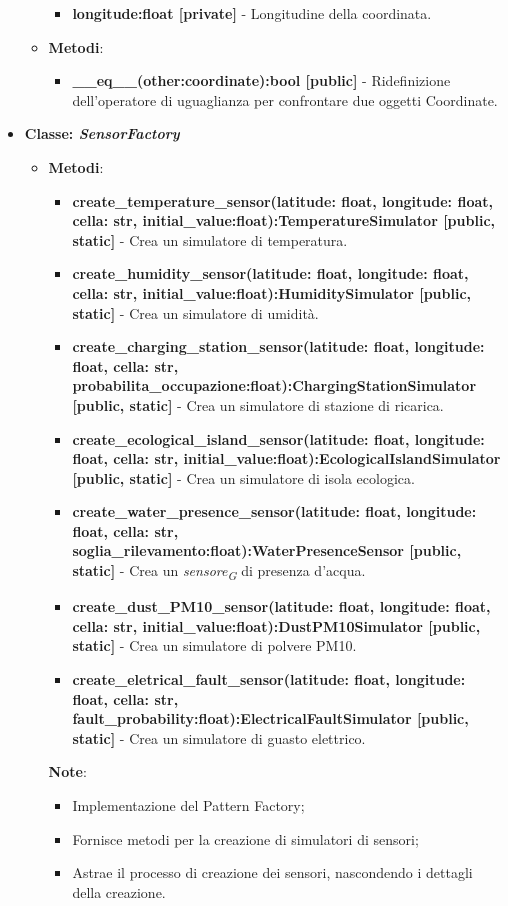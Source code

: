 \begin{itemize}
\begin{itemize}
\begin{itemize}
        \item \textbf{longitude:float [private]} - Longitudine della coordinata.
    \end{itemize}
    \item     \textbf{Metodi}: 
    \begin{itemize}
        \item \textbf{\_\_eq\_\_(other:coordinate):bool [public]} - Ridefinizione dell'operatore di uguaglianza per confrontare due oggetti Coordinate.
    \end{itemize}
\end{itemize}
    \item{\textbf{Classe: \textit{SensorFactory}}}
    \begin{itemize}
        \item    \textbf{Metodi}: 
\begin{itemize}
    \item \textbf{create\_temperature\_sensor(latitude: float, longitude: float, cella: str, initial\_value:float):TemperatureSimulator [public, static]} - Crea un simulatore di temperatura.
    \item \textbf{create\_humidity\_sensor(latitude: float, longitude: float, cella: str, initial\_value:float):HumiditySimulator [public, static]} - Crea un simulatore di umidità.
    \item \textbf{create\_charging\_station\_sensor(latitude: float, longitude: float, cella: str, probabilita\_occupazione:float):ChargingStationSimulator [public, static]} - Crea un simulatore di stazione di ricarica.
    \item \textbf{create\_ecological\_island\_sensor(latitude: float, longitude: float, cella: str, initial\_value:float):EcologicalIslandSimulator [public, static]} - Crea un simulatore di isola ecologica.
    \item \textbf{create\_water\_presence\_sensor(latitude: float, longitude: float, cella: str, soglia\_rilevamento:float):WaterPresenceSensor [public, static]} - Crea un \textit{sensore}\textsubscript{\textit{G}} di presenza d'acqua.
    \item \textbf{create\_dust\_PM10\_sensor(latitude: float, longitude: float, cella: str, initial\_value:float):DustPM10Simulator [public, static]} - Crea un simulatore di polvere PM10.
    \item \textbf{create\_eletrical\_fault\_sensor(latitude: float, longitude: float, cella: str, fault\_probability:float):ElectricalFaultSimulator [public, static]} - Crea un simulatore di guasto elettrico.
\end{itemize}
\textbf{Note}:
    \begin{itemize}
        \item Implementazione del Pattern Factory;
        \item Fornisce metodi per la creazione di simulatori di sensori;
        \item Astrae il processo di creazione dei sensori, nascondendo i dettagli della creazione.
    \end{itemize}
\end{itemize}
\end{itemize}

